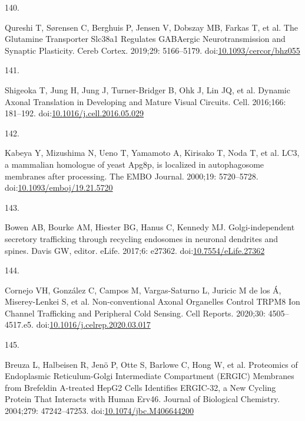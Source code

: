 \documentclass[
  12pt,
  a4paper,
]{book}
\newlength{\cslhangindent}
\newlength{\csllabelwidth}
\newenvironment{CSLReferences}[2] %
 {\begin{list}{}{%
  \setlength{\itemindent}{0pt}
  \setlength{\leftmargin}{0pt}
  \setlength{\parsep}{0pt}
  \ifodd #1
   \setlength{\leftmargin}{\cslhangindent}
   \setlength{\itemindent}{-1\cslhangindent}
  \fi
  \setlength{\itemsep}{#2\baselineskip}}}
 {\end{list}}
\newcommand{\CSLLeftMargin}[1]{\parbox[t]{\csllabelwidth}{\strut#1\strut}}
\newcommand{\CSLRightInline}[1]{\parbox[t]{\linewidth - \csllabelwidth}{\strut#1\strut}}
\begin{document}
\begin{CSLReferences}{0}{1}
\CSLLeftMargin{140. }%
\CSLRightInline{Qureshi T, Sørensen C, Berghuis P, Jensen V, Dobszay MB, Farkas T, et al. The {Glutamine Transporter Slc38a1 Regulates GABAergic Neurotransmission} and {Synaptic Plasticity}. Cereb Cortex. 2019;29: 5166--5179. doi:\href{https://doi.org/10.1093/cercor/bhz055}{10.1093/cercor/bhz055}}

\CSLLeftMargin{141. }%
\CSLRightInline{Shigeoka T, Jung H, Jung J, Turner-Bridger B, Ohk J, Lin JQ, et al. Dynamic {Axonal Translation} in {Developing} and {Mature Visual Circuits}. Cell. 2016;166: 181--192. doi:\href{https://doi.org/10.1016/j.cell.2016.05.029}{10.1016/j.cell.2016.05.029}}

\CSLLeftMargin{142. }%
\CSLRightInline{Kabeya Y, Mizushima N, Ueno T, Yamamoto A, Kirisako T, Noda T, et al. {LC3}, a mammalian homologue of yeast {Apg8p}, is localized in autophagosome membranes after processing. The EMBO Journal. 2000;19: 5720--5728. doi:\href{https://doi.org/10.1093/emboj/19.21.5720}{10.1093/emboj/19.21.5720}}

\CSLLeftMargin{143. }%
\CSLRightInline{Bowen AB, Bourke AM, Hiester BG, Hanus C, Kennedy MJ. Golgi-independent secretory trafficking through recycling endosomes in neuronal dendrites and spines. Davis GW, editor. eLife. 2017;6: e27362. doi:\href{https://doi.org/10.7554/eLife.27362}{10.7554/eLife.27362}}

\CSLLeftMargin{144. }%
\CSLRightInline{Cornejo VH, González C, Campos M, Vargas-Saturno L, Juricic M de los Á, Miserey-Lenkei S, et al. Non-conventional {Axonal Organelles Control TRPM8 Ion Channel Trafficking} and {Peripheral Cold Sensing}. Cell Reports. 2020;30: 4505--4517.e5. doi:\href{https://doi.org/10.1016/j.celrep.2020.03.017}{10.1016/j.celrep.2020.03.017}}

\CSLLeftMargin{145. }%
\CSLRightInline{Breuza L, Halbeisen R, Jenö P, Otte S, Barlowe C, Hong W, et al. Proteomics of {Endoplasmic Reticulum-Golgi Intermediate Compartment} ({ERGIC}) {Membranes} from {Brefeldin A-treated HepG2 Cells Identifies ERGIC-32}, a {New Cycling Protein That Interacts} with {Human Erv46}. Journal of Biological Chemistry. 2004;279: 47242--47253. doi:\href{https://doi.org/10.1074/jbc.M406644200}{10.1074/jbc.M406644200}}


\end{CSLReferences}
\end{document}
